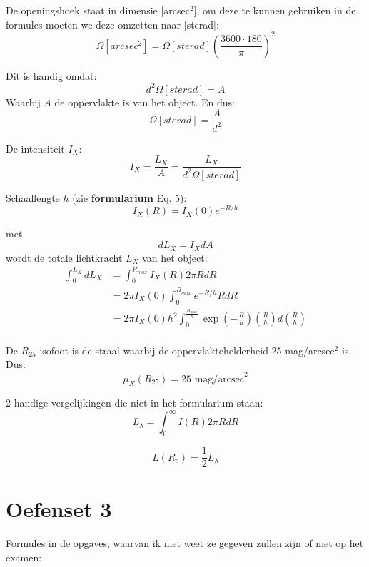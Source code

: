 \documentclass[a4paper,twoside]{article}
\theoremstyle{definition}
\theoremstyle{plain}
\begin{document}
De openingshoek staat in dimensie [arcsec\(^2\)], om deze te kunnen gebruiken in de formules moeten we deze omzetten naar [sterad]:
\[
\Omega[arcsec^2] = \Omega [sterad] \left(\frac{3600 \cdot 180}{\pi}\right)^2  
\]

Dit is handig omdat:
\[
d^2 \Omega [sterad] = A
\]
Waarbij \(A\) de oppervlakte is van het object. En dus:
\[
\Omega [sterad] = \frac{A}{d^2}
\]

De intensiteit \(I_X\):
\begin{equation}
    I_X = \frac{L_X}{A} = \frac{L_X}{d^2 \Omega [sterad]}
\end{equation}

Schaallengte \(h\) (zie \textbf{formularium} Eq. 5):
\begin{equation}
    I_X (R) = I_X (0) e^{-R/h}
\end{equation}

met 
\[
dL_X = I_X dA 
\]
wordt de totale lichtkracht \(L_X\) van het object:
\begin{align*}
    \int_0^{L_X} d L_X &= \int_0^{R_{max}} I_X (R) 2 \pi R dR\\
    & = 2\pi I_X(0) \int_0^{R_{max}} e^{-R/h}  R dR \\
    & = 2\pi I_X(0) h^2 \int_0^{\frac{R_{max}}{h}} \exp \left( -\frac{R}{h} \right) \left( \frac{R}{h} \right) d\left( \frac{R}{h} \right)\\
\end{align*}

De \(R_{25}\)-isofoot is de straal waarbij de oppervlaktehelderheid 25 mag/arcsec\(^2\) is. Dus:
\begin{equation}
    \mu_X (R_{25}) = 25 \text{ mag/arcsec}^2
\end{equation}

2 handige vergelijkingen die niet in het formularium staan:
\begin{equation}
    \label{eq:handig1}
    L_\lambda = \int_{0}^{\infty} I(R) 2 \pi R dR
\end{equation}

\begin{equation}
    \label{eq:handig2}
   L(R_e) = \frac{1}{2} L_\lambda
\end{equation}


\section{Oefenset 3}

Formules in de opgaves, waarvan ik niet weet ze gegeven zullen zijn of niet op het examen:
\end{document}
